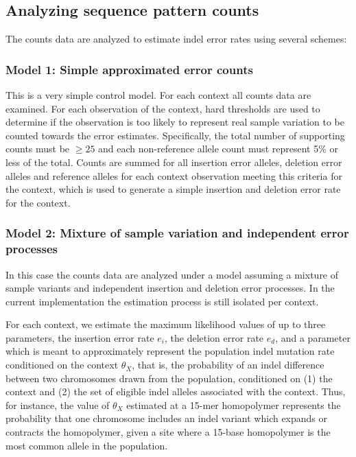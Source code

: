 \documentclass{article}
\begin{document}
\subsection{Analyzing sequence pattern counts}

The counts data are analyzed to estimate indel error rates using several schemes:

\subsubsection{Model 1: Simple approximated error counts}

This is a very simple control model. For each context all counts data are examined. For each observation of the context, hard thresholds are used to determine if the observation is too likely to represent real sample variation to be counted towards the error estimates. Specifically, the total number of supporting counts must be $\geq 25$ and each non-reference allele count must represent 5\% or less of the total. Counts are summed for all insertion error alleles, deletion error alleles and reference alleles for each context observation meeting this criteria for the context, which is used to generate a simple insertion and deletion error rate for the context.

\subsubsection{Model 2: Mixture of sample variation and independent error processes}

In this case the counts data are analyzed under a model assuming a mixture of sample variants and independent insertion and deletion error processes. In the current implementation the estimation process is still isolated per context.

For each context, we estimate the maximum likelihood values of up to three parameters, the insertion error rate $e_i$, the deletion error rate $e_d$, and a parameter which is meant to approximately represent the population indel mutation rate conditioned on the context $\theta_{X}$, that is, the probability of an indel difference between two chromosomes drawn from the population, conditioned on (1) the context and (2) the set of eligible indel alleles associated with the context. Thus, for instance, the value of $\theta_{X}$ estimated at a 15-mer homopolymer represents the probability that one chromosome includes an indel variant which expands or contracts the homopolymer, given a site where a 15-base homopolymer is the most common allele in the population.
\end{document}
